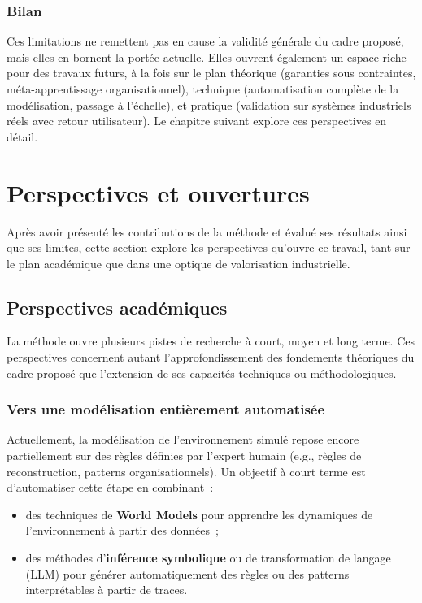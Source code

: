 \subsubsection*{Bilan}

\noindent
Ces limitations ne remettent pas en cause la validité générale du cadre proposé, mais elles en bornent la portée actuelle. Elles ouvrent également un espace riche pour des travaux futurs, à la fois sur le plan théorique (garanties sous contraintes, méta-apprentissage organisationnel), technique (automatisation complète de la modélisation, passage à l’échelle), et pratique (validation sur systèmes industriels réels avec retour utilisateur). Le chapitre suivant explore ces perspectives en détail.


\section*{Perspectives et ouvertures}
\label{sec:perspectives}

\noindent
Après avoir présenté les contributions de la méthode  et évalué ses résultats ainsi que ses limites, cette section explore les perspectives qu’ouvre ce travail, tant sur le plan académique que dans une optique de valorisation industrielle.

\subsection{Perspectives académiques}
\label{sec:perspectives_academiques}

\noindent
La méthode  ouvre plusieurs pistes de recherche à court, moyen et long terme. Ces perspectives concernent autant l’approfondissement des fondements théoriques du cadre proposé que l’extension de ses capacités techniques ou méthodologiques.

\subsubsection*{Vers une modélisation entièrement automatisée}

Actuellement, la modélisation de l’environnement simulé repose encore partiellement sur des règles définies par l’expert humain (e.g., règles de reconstruction, patterns organisationnels). Un objectif à court terme est d’automatiser cette étape en combinant~:
\begin{itemize}
    \item des techniques de \textbf{World Models} pour apprendre les dynamiques de l’environnement à partir des données~;
    \item des méthodes d’\textbf{inférence symbolique} ou de transformation de langage (LLM) pour générer automatiquement des règles ou des patterns interprétables à partir de traces.
\end{itemize}

